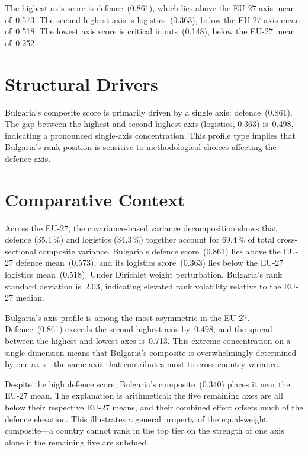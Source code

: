 \documentclass[12pt,a4paper]{article}
\begin{document}
The highest axis score is defence~(0.861), which lies above the EU-27 axis mean of~0.573.  The second-highest axis is logistics~(0.363), below the EU-27 axis mean of~0.518.  The lowest axis score is critical inputs~(0.148), below the EU-27 mean of~0.252.


\section{Structural Drivers}
\label{sec:drivers}

\begin{sloppypar}
Bulgaria's composite score is primarily driven by a single axis: defence~(0.861).  The gap between the highest and second-highest axis (logistics, 0.363) is~0.498, indicating a pronounced single-axis concentration.  This profile type implies that Bulgaria's rank position is sensitive to methodological choices affecting the defence axis.
\end{sloppypar}


\section{Comparative Context}
\label{sec:comparative}

Across the EU-27, the covariance-based variance decomposition shows that defence (35.1\,\%) and logistics (34.3\,\%) together account for 69.4\,\% of total cross-sectional composite variance.  Bulgaria's defence score~(0.861) lies above the EU-27 defence mean~(0.573), and its logistics score~(0.363) lies below the EU-27 logistics mean~(0.518).  Under Dirichlet weight perturbation, Bulgaria's rank standard deviation is~2.03, indicating elevated rank volatility relative to the EU-27 median.



Bulgaria's axis profile is among the most asymmetric in the EU-27.  Defence~(0.861) exceeds the second-highest axis by~0.498, and the spread between the highest and lowest axes is~0.713.  This extreme concentration on a single dimension means that Bulgaria's composite is overwhelmingly determined by one axis---the same axis that contributes most to cross-country variance.

Despite the high defence score, Bulgaria's composite~(0.340) places it near the EU-27 mean.  The explanation is arithmetical: the five remaining axes are all below their respective EU-27 means, and their combined effect offsets much of the defence elevation.  This illustrates a general property of the equal-weight composite---a country cannot rank in the top tier on the strength of one axis alone if the remaining five are subdued.
\end{document}
